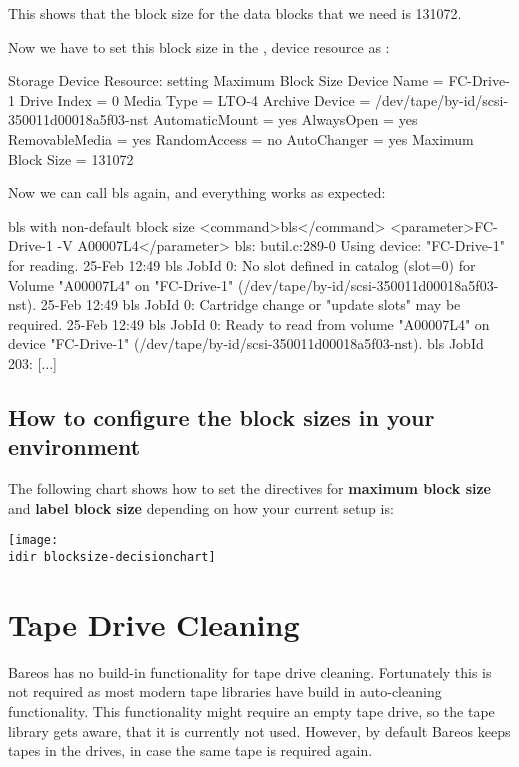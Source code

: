 This shows that the block size for the data blocks that we need is 131072.

Now we have to set this block size in the , device
resource as :

\begin{bconfig}{Storage Device Resource: setting Maximum Block Size}
Device {
  Name = FC-Drive-1
  Drive Index = 0
  Media Type = LTO-4
  Archive Device = /dev/tape/by-id/scsi-350011d00018a5f03-nst
  AutomaticMount = yes
  AlwaysOpen = yes
  RemovableMedia = yes
  RandomAccess = no
  AutoChanger = yes
  Maximum Block Size = 131072
}
\end{bconfig}


Now we can call bls again, and everything works as expected:
\begin{commands}{bls with non-default block size}
<command>bls</command> <parameter>FC-Drive-1 -V A00007L4</parameter>
bls: butil.c:289-0 Using device: "FC-Drive-1" for reading.
25-Feb 12:49 bls JobId 0: No slot defined in catalog (slot=0) for Volume "A00007L4" on "FC-Drive-1" (/dev/tape/by-id/scsi-350011d00018a5f03-nst).
25-Feb 12:49 bls JobId 0: Cartridge change or "update slots" may be required.
25-Feb 12:49 bls JobId 0: Ready to read from volume "A00007L4" on device "FC-Drive-1" (/dev/tape/by-id/scsi-350011d00018a5f03-nst).
bls JobId 203: [...]
\end{commands}


\subsection*{How to configure the block sizes in your environment}
The following chart shows how to set the directives for {\bf maximum block size} and {\bf label block size}
depending on how your current setup is:

\begin{center}
\texttt{[image: \\idir blocksize-decisionchart]}
\end{center}

\section{Tape Drive Cleaning}

Bareos has no build-in functionality for tape drive cleaning.
Fortunately this is not required as most modern tape libraries
have build in auto-cleaning functionality.
This functionality might require an empty tape drive,
so the tape library gets aware, that it is currently not used.
However, by default Bareos keeps tapes in the drives,
in case the same tape is required again.

